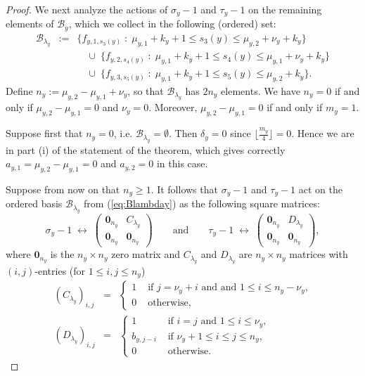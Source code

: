 \documentclass{amsart}
\numberwithin{equation}{section}
\numberwithin{table}{section}
\theoremstyle{plain}
\theoremstyle{definition}
\theoremstyle{remark}
\begin{document}
\begin{proof}
We next analyze the actions of $\sigma_y-1$ and $\tau_y-1$ on the remaining elements of $\mathcal{B}_y$, which we collect in the following (ordered) set: 
\begin{eqnarray}
\label{eq:Blambday}
\mathcal{B}_{\lambda_y} &:=& \{f_{y,1,s_3(y)} \; : \; \mu_{y,1}+k_y+1 \le s_3(y) \le \mu_{y,2}  + \nu_y + k_y \}\\
\nonumber
&& \quad \cup \; \{f_{y,2,s_4(y)} \; : \; \mu_{y,1}+k_y+1 \le s_4(y) \le \mu_{y,1} + \nu_y + k_y\}\\
\nonumber
&& \quad \cup \; \{f_{y,3,s_5(y)} \; : \; \mu_{y,1}+k_y+1 \le s_5(y) \le \mu_{y,2} + k_y\}.
\end{eqnarray}
Define $n_y:= \mu_{y,2}-\mu_{y,1}+\nu_y$, so that $\mathcal{B}_{\lambda_y}$ has $2n_y$ elements. We have $n_y=0$ if and only if $\mu_{y,2}-\mu_{y,1}=0$ and $\nu_y=0$. Moreover, $\mu_{y,2}-\mu_{y,1}=0$ if and only if $m_y=1$.

Suppose first that $n_y=0$, i.e. $\mathcal{B}_{\lambda_y}=\emptyset$.  Then $\delta_y=0$ since $\lfloor \frac{m_y}{4}\rfloor=0$. Hence we are in part (i) of the statement of the theorem, which gives correctly $a_{y,1}=\mu_{y,2}-\mu_{y,1}=0$ and $a_{y,2}=0$ in this case.

Suppose from now on that $n_y\ge 1$. It follows that $\sigma_y-1$ and $\tau_y-1$ act on the ordered basis $\mathcal{B}_{\lambda_y}$ from (\ref{eq:Blambday}) as the following square matrices:
$$\sigma_y-1 \;\longleftrightarrow\; \left(\begin{array}{c|c} \mathbf{0}_{n_y}&C_{\lambda_y}\\ \hline \mathbf{0}_{n_y}&\mathbf{0}_{n_y}\end{array}\right)
\qquad\mbox{and}\qquad
\tau_y-1\;\longleftrightarrow\; \left(\begin{array}{c|c} \mathbf{0}_{n_y}&D_{\lambda_y}\\ \hline \mathbf{0}_{n_y}&\mathbf{0}_{n_y}\end{array}\right)  ,$$
where $\mathbf{0}_{n_y}$ is the $n_y\times n_y$ zero matrix and $C_{\lambda_y}$ and $D_{\lambda_y}$ are $n_y\times n_y$ matrices with $(i,j)$-entries (for $1\le i,j \le n_y$)
\begin{eqnarray*}
\left(C_{\lambda_y}\right)_{i,j}&=&\left\{\begin{array}{cl}
1 & \mbox{ if $j=\nu_y+i$ and  and $1\le i\le n_y-\nu_y$,}\\
0 & \mbox{ otherwise,}
\end{array}\right. \\
\left(D_{\lambda_y}\right)_{i,j}&=&\left\{\begin{array}{cl}
1 &\mbox{ if $i=j$ and $1\le i \le \nu_y$,}\\
b_{y,j-i} & \mbox{ if $\nu_y+1\le i\le j\le n_y$,}\\
0 & \mbox{ otherwise.}
\end{array}\right. 
\end{eqnarray*}


\end{proof}
\end{document}
